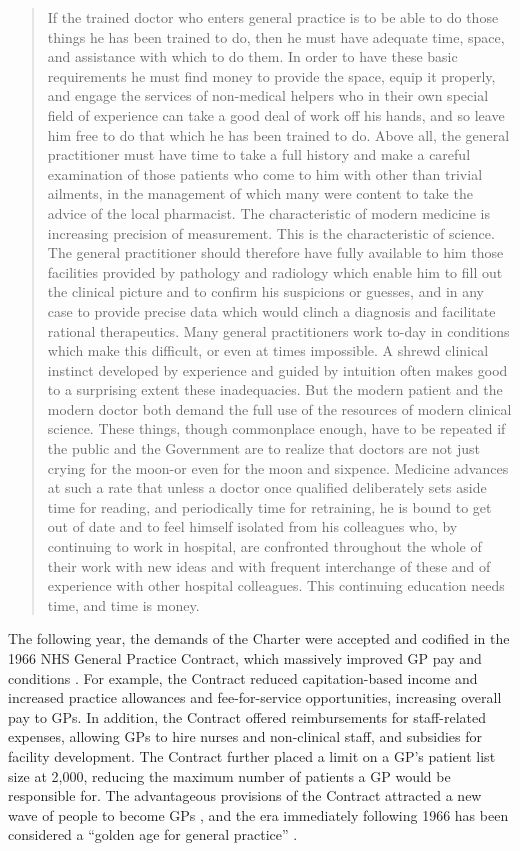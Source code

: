 \documentclass[12pt]{article}
\begin{document}
\begin{quote}
  If the trained doctor who enters general practice is to be able to do those things he has been trained to do, then he must have adequate time, space, and assistance with which to do them. In order to have these basic requirements he must find money to provide the space, equip it properly, and engage the services of non-medical helpers who in their own special field of experience can take a good deal of work off his hands, and so leave him free to do that which he has been trained to do. Above all, the general practitioner must have time to take a full history and make a careful examination of those patients who come to him with other than trivial ailments, in the management of which many were content to take the advice of the local pharmacist. The characteristic of modern medicine is increasing precision of measurement. This is the characteristic of science. The general practitioner should therefore have fully available to him those facilities provided by pathology and radiology which enable him to fill out the clinical picture and to confirm his suspicions or guesses, and in any case to provide precise data which would clinch a diagnosis and facilitate rational therapeutics. Many general practitioners work to-day in conditions which make this difficult, or even at times impossible. A shrewd clinical instinct developed by experience and guided by intuition often makes good to a surprising extent these inadequacies. But the modern patient and the modern doctor both demand the full use of the resources of modern clinical science. These things, though commonplace enough, have to be repeated if the public and the Government are to realize that doctors are not just crying for the moon-or even for the moon and sixpence. Medicine advances at such a rate that unless a doctor once qualified deliberately sets aside time for reading, and periodically time for retraining, he is bound to get out of date and to feel himself isolated from his colleagues who, by continuing to work in hospital, are confronted throughout the whole of their work with new ideas and with frequent interchange of these and of experience with other hospital colleagues. This continuing education needs time, and time is money.
\end{quote}


The following year, the demands of the Charter were accepted and codified in the 1966 NHS General Practice Contract, which massively improved GP pay and conditions \citep{gillamFamilyDoctorCharter2017}. For example, the Contract reduced capitation-based income and increased practice allowances and fee-for-service opportunities, increasing overall pay to GPs. In addition, the Contract offered reimbursements for staff-related expenses, allowing GPs to hire nurses and non-clinical staff, and subsidies for facility development. The Contract further placed a limit on a GP's patient list size at 2,000, reducing the maximum number of patients a GP would be responsible for. The advantageous provisions of the Contract attracted a new wave of people to become GPs \citep{horderHistoryVocationalTraining1979}, and the era immediately following 1966 has been considered a ``golden age for general practice'' \citep{addicottCommissioningFundingGeneral2014}.
\end{document}
